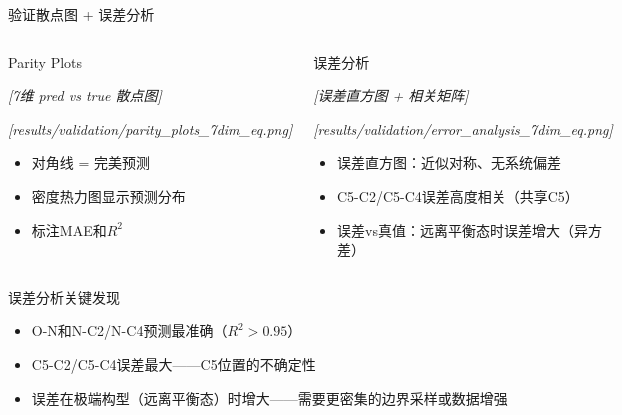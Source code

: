 \documentclass[aspectratio=169,9pt]{beamer}
\begin{document}
\begin{frame}{验证散点图 + 误差分析}
  \begin{columns}[T]
    \begin{block}{Parity Plots}
      \scriptsize
      \begin{center}
        \textit{[7维 pred vs true 散点图]}

        \textit{[results/validation/parity\_plots\_7dim\_eq.png]}
      \end{center}
      \begin{itemize}
        \item 对角线 = 完美预测
        \item 密度热力图显示预测分布
        \item 标注MAE和$R^2$
      \end{itemize}
    \end{block}

    \begin{block}{误差分析}
      \scriptsize
      \begin{center}
        \textit{[误差直方图 + 相关矩阵]}

        \textit{[results/validation/error\_analysis\_7dim\_eq.png]}
      \end{center}
      \begin{itemize}
        \item 误差直方图：近似对称、无系统偏差
        \item C5-C2/C5-C4误差高度相关（共享C5）
        \item 误差vs真值：远离平衡态时误差增大（异方差）
      \end{itemize}
    \end{block}
  \end{columns}

  \vspace{4pt}
  \begin{block}{误差分析关键发现}
    \scriptsize
    \begin{itemize}
      \item O-N和N-C2/N-C4预测最准确（$R^2 > 0.95$）
      \item C5-C2/C5-C4误差最大——C5位置的不确定性
      \item 误差在极端构型（远离平衡态）时增大——需要更密集的边界采样或数据增强
    \end{itemize}
  \end{block}
\end{frame}
\end{document}
